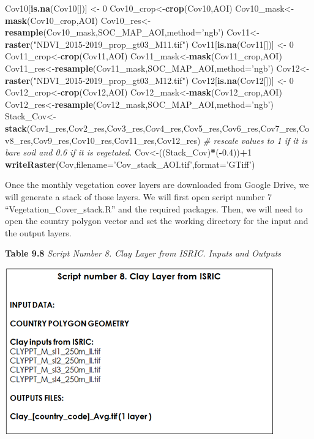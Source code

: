 \documentclass[
  10pt,
  b5paper,
]{book}
\newenvironment{Shaded}{\begin{snugshade}}{\end{snugshade}}
\newcommand{\CommentTok}[1]{\textcolor[rgb]{0.56,0.35,0.01}{\textit{#1}}}
\newcommand{\DataTypeTok}[1]{\textcolor[rgb]{0.13,0.29,0.53}{#1}}
\newcommand{\DecValTok}[1]{\textcolor[rgb]{0.00,0.00,0.81}{#1}}
\newcommand{\FloatTok}[1]{\textcolor[rgb]{0.00,0.00,0.81}{#1}}
\newcommand{\KeywordTok}[1]{\textcolor[rgb]{0.13,0.29,0.53}{\textbf{#1}}}
\newcommand{\NormalTok}[1]{#1}
\newcommand{\OperatorTok}[1]{\textcolor[rgb]{0.81,0.36,0.00}{\textbf{#1}}}
\newcommand{\StringTok}[1]{\textcolor[rgb]{0.31,0.60,0.02}{#1}}
\begin{document}
\begin{Shaded}
\begin{Highlighting}[]
\NormalTok{Cov10[}\KeywordTok{is.na}\NormalTok{(Cov10[])] <-}\StringTok{ }\DecValTok{0}
\NormalTok{Cov10_crop<-}\KeywordTok{crop}\NormalTok{(Cov10,AOI)}
\NormalTok{Cov10_mask<-}\KeywordTok{mask}\NormalTok{(Cov10_crop,AOI)}
\NormalTok{Cov10_res<-}\KeywordTok{resample}\NormalTok{(Cov10_mask,SOC_MAP_AOI,}\DataTypeTok{method=}\StringTok{'ngb'}\NormalTok{) }
\NormalTok{Cov11<-}\KeywordTok{raster}\NormalTok{(}\StringTok{"NDVI_2015-2019_prop_gt03_M11.tif"}\NormalTok{)}
\NormalTok{Cov11[}\KeywordTok{is.na}\NormalTok{(Cov11[])] <-}\StringTok{ }\DecValTok{0}
\NormalTok{Cov11_crop<-}\KeywordTok{crop}\NormalTok{(Cov11,AOI)}
\NormalTok{Cov11_mask<-}\KeywordTok{mask}\NormalTok{(Cov11_crop,AOI)}
\NormalTok{Cov11_res<-}\KeywordTok{resample}\NormalTok{(Cov11_mask,SOC_MAP_AOI,}\DataTypeTok{method=}\StringTok{'ngb'}\NormalTok{) }
\NormalTok{Cov12<-}\KeywordTok{raster}\NormalTok{(}\StringTok{"NDVI_2015-2019_prop_gt03_M12.tif"}\NormalTok{)}
\NormalTok{Cov12[}\KeywordTok{is.na}\NormalTok{(Cov12[])] <-}\StringTok{ }\DecValTok{0}
\NormalTok{Cov12_crop<-}\KeywordTok{crop}\NormalTok{(Cov12,AOI)}
\NormalTok{Cov12_mask<-}\KeywordTok{mask}\NormalTok{(Cov12_crop,AOI)}
\NormalTok{Cov12_res<-}\KeywordTok{resample}\NormalTok{(Cov12_mask,SOC_MAP_AOI,}\DataTypeTok{method=}\StringTok{'ngb'}\NormalTok{) }
\NormalTok{Stack_Cov<-}\KeywordTok{stack}\NormalTok{(Cov1_res,Cov2_res,Cov3_res,Cov4_res,Cov5_res,Cov6_res,Cov7_res,Cov8_res,Cov9_res,Cov10_res,Cov11_res,Cov12_res)}
\CommentTok{# rescale values to 1 if it is bare soil and 0.6 if it is vegetated.}
\NormalTok{Cov<-((Stack_Cov)}\OperatorTok{*}\NormalTok{(}\OperatorTok{-}\FloatTok{0.4}\NormalTok{))}\OperatorTok{+}\DecValTok{1}
\KeywordTok{writeRaster}\NormalTok{(Cov,}\DataTypeTok{filename=}\StringTok{'Cov_stack_AOI.tif'}\NormalTok{,}\DataTypeTok{format=}\StringTok{'GTiff'}\NormalTok{)}
\end{Highlighting}
\end{Shaded}

Once the monthly vegetation cover layers are downloaded from Google Drive, we will generate a stack of those layers. We will first open script number 7 ``Vegetation\_Cover\_stack.R'' and the required packages. Then, we will need to open the country polygon vector and set the working directory for the input and the output layers.

\textbf{Table 9.8} \emph{Script Number 8. Clay Layer from ISRIC. Inputs and Outputs}

\includegraphics{tables/Table_9.7.png}
\end{document}
